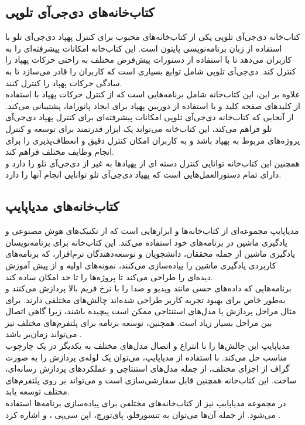 \subsection{کتاب‌خانه‌های دی‌جی‌آی تلوپی\protect{}}
کتاب‌خانه دی‌جی‌آی تلوپی یکی از کتاب‌خانه‌های محبوب برای کنترل پهپاد دی‌جی‌آی تلو با استفاده از زبان برنامه‌نویسی پایتون است. این کتاب‌خانه امکانات پیشرفته‌ای را به کاربران می‌دهد تا با استفاده 
از دستورات پیش‌فرض مختلف به راحتی حرکات پهپاد را کنترل کند. دی‌جی‌آی تلوپی شامل توابع بسیاری است که کاربران را قادر می‌سازد تا به سادگی حرکات پهپاد را کنترل کنند.
\\
علاوه بر این، این کتاب‌خانه شامل برنامه‌هایی است که از کنترل حرکات پهپاد با استفاده از کلیدهای صفحه کلید و یا استفاده از دوربین پهپاد برای ایجاد پانوراما، پشتیبانی می‌کند. از آنجایی که کتاب‌خانه دی‌جی‌آی تلوپی امکانات پیشرفته‌ای برای کنترل پهپاد دی‌جی‌آی تلو فراهم می‌کند، این کتاب‌خانه 
می‌تواند یک ابزار قدرتمند برای توسعه و کنترل پروژه‌های مربوط به پهپاد باشد و به کاربران امکان کنترل دقیق و انعطاف‌پذیری را برای انجام وظایف مختلف فراهم کند.
\\
همچنین این کتاب‌خانه توانایی  کنترل دسته ای از پهپادها به غیر از دی‌جی‌آی تلو را دارد و دارای تمام  دستورالعمل‌هایی است که پهپاد دی‌جی‌آی تلو توانایی انجام آنها را دارد.


\subsection[کتاب‌خانه‌های مدیاپایپ]{کتاب‌خانه‌های مدیاپایپ \protect{}}
مدیاپایپ مجموعه‌ای از کتاب‌خانه‌ها و ابزارهایی است که از تکنیک‌های هوش مصنوعی و یادگیری ماشین در برنامه‌های خود استفاده می‌کند. این کتاب‌خانه برای برنامه‌نویسان یادگیری ماشین از جمله محققان، دانشجویان و توسعه‌دهندگان
 نرم‌افزار، که برنامه‌های کاربردی یادگیری ماشین را پیاده‌سازی می‌کنند، نمونه‌های اولیه و از پیش آموزش دیده‌ای را طراحی می‌کند تا پروژه‌ها را تا حد امکان ساده کند.
\\
برنامه‌هایی که داده‌های حسی مانند ویدیو و صدا را با نرخ فریم بالا پردازش می‌کنند و به‌طور خاص برای بهبود تجربه کاربر
 طراحی شده‌اند چالش‌های مختلفی دارند. برای مثال مراحل پردازش یا مدل‌های استنتاجی ممکن است پیچیده باشند، زیرا گاهی اتصال بین مراحل بسیار زیاد است. همچنین، توسعه برنامه برای پلتفرم‌های مختلف نیز می‌تواند زمان‌بر باشد \cite{lugaresi2019mediapipe}. 
\\
مدیاپایپ این چالش‌ها را با انتزاع و اتصال مدل‌های مختلف به یکدیگر در یک چارچوب مناسب حل می‌کند. با استفاده از مدیاپایپ، می‌توان یک لوله‌ی پردازش را به صورت گراف از اجزای مختلف، از جمله مدل‌های استنتاجی و عملکردهای پردازش رسانه‌ای، ساخت. این کتاب‌خانه همچنین قابل سفارشی‌سازی است و می‌تواند بر روی پلتفرم‌های مختلف توسعه یابد.
\\
در مجموعه مدیاپایپ نیز از کتاب‌خانه‌های مختلفی برای پیاده‌سازی برنامه‌ها استفاده می‌شود. از جمله آن‌ها می‌توان به تنسورفلو، پای‌تورچ، اپن سی‌پی
،  و  اشاره کرد \cite{harris2021applying}.


